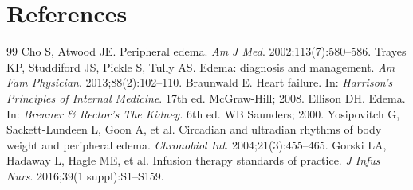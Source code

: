 \section*{References}
\begin{thebibliography}{99}
Cho S, Atwood JE. Peripheral edema. \textit{Am J Med}. 2002;113(7):580--586.
Trayes KP, Studdiford JS, Pickle S, Tully AS. Edema: diagnosis and management. \textit{Am Fam Physician}. 2013;88(2):102--110.
Braunwald E. Heart failure. In: \textit{Harrison's Principles of Internal Medicine}. 17th ed. McGraw-Hill; 2008.
Ellison DH. Edema. In: \textit{Brenner \& Rector's The Kidney}. 6th ed. WB Saunders; 2000.
Yosipovitch G, Sackett-Lundeen L, Goon A, et al. Circadian and ultradian rhythms of body weight and peripheral edema. \textit{Chronobiol Int}. 2004;21(3):455--465.
Gorski LA, Hadaway L, Hagle ME, et al. Infusion therapy standards of practice. \textit{J Infus Nurs}. 2016;39(1 suppl):S1--S159.
\end{thebibliography}
